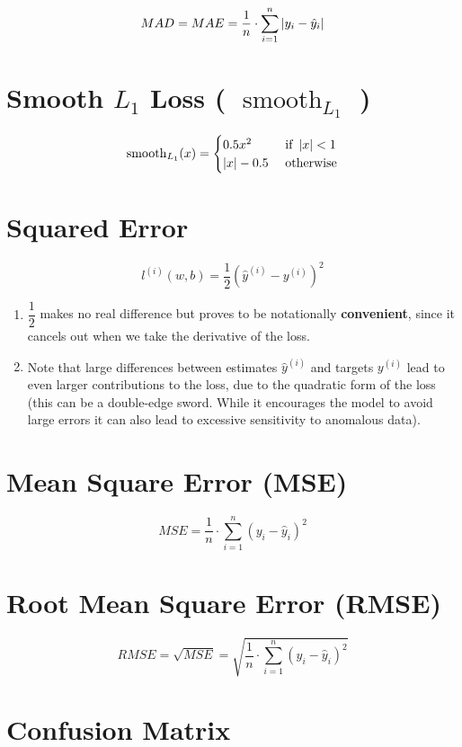 \[
    MAD = MAE = \displaystyle\dfrac{1}{n} \cdot \sum_{i=1}^{n} \left|  y_i - \hat{y}_i  \right|
\]

\section{Smooth $L_1$ Loss ( $\operatorname{smooth}_{L_1}$ )}
\[
    \displaystyle
    \operatorname{smooth}_{L_1}(x) = \begin{cases}
        0.5x^2 & \text{ if } \left| x \right| < 1 \\
        \left| x \right| - 0.5 & \text{ otherwise}
    \end{cases}
\]


\section{Squared Error \cite{dnn-1}} \label{Squared Error}

\[
    l^{(i)}(w,b) = \dfrac{1}{2}
    \left( \hat{y}^{(i)} - y^{(i)} \right)^2
\]

\begin{enumerate}
    \item $\dfrac{1}{2}$ makes no real difference but proves to be notationally \textbf{convenient}, since it cancels out when we take the derivative of the loss.

    \item Note that large differences between estimates $\hat{y}^{(i)}$ and targets $y^{(i)}$ lead to even larger contributions to the loss, due to the quadratic form of the loss (this can be a double-edge sword. While it encourages the model to avoid large errors it can also lead to excessive sensitivity to anomalous data).
\end{enumerate}

\section{Mean Square Error (MSE)}\label{Mean Square Error (MSE)}
\[
    MSE = \displaystyle\dfrac{1}{n} \cdot \sum_{i=1}^{n} ( y_i - \hat{y}_i )^2
\]

\section{Root Mean Square Error (RMSE)}\label{Root Mean Square Error (RMSE)}
\[
    RMSE = \sqrt{MSE} = \displaystyle\sqrt{\dfrac{1}{n} \cdot \sum_{i=1}^{n} ( y_i - \hat{y}_i )^2}
\]


\section{Confusion Matrix}

